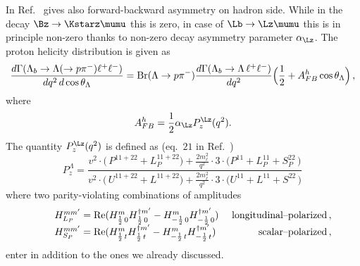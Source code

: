 In Ref.~\cite{Gutsche:2013pp} gives also forward-backward asymmetry on hadron side. While in the
decay $\Bz\to\Kstarz\mumu$ this is zero, in case of $\Lb\to\Lz\mumu$ this is in principle non-zero
thanks to non-zero \Lz decay asymmetry parameter $\alpha_{\Lz}$. The proton helicity distribution is
given as
\begin{equation}
\label{pz2}
\frac{d\Gamma(\Lambda_{b}\to \Lambda(\to p \pi^{-})\ell^{+}\ell^{-})}
     {dq^2\,d\cos\theta_\Lambda} 
={\rm Br}(\Lambda \to p\pi^{-})
 \frac{d\Gamma(\Lambda_b \to \Lambda\, \ell^{+}\ell^{-})}{d q^2}
\Big(\frac{1}{2}+A_{FB}^h\cos\theta_\Lambda\Big) \,, 
\end{equation}
where 
\begin{equation}
A_{FB}^h=\frac{1}{2}\alpha_{\Lz}P_z^\Lz(q^2).
\end{equation} 
The quantity $P_z^\Lz(q^2)$ is defined as (eq.~$21$ in Ref.~\cite{Gutsche:2013pp})
\begin{equation}
\label{pz1}
P_{z}^{\Lambda}=\frac{
v^{2}\cdot\big(\,P^{11+22}
+L_{P}^{11+22}\big)+\frac{2m_{\ell}^{2}}{q^{2}}\cdot 3 \cdot 
\big(P^{11}+L_{P}^{11}
+S_{P}^{22}\,\big)
}
{v^{2}\cdot\big(\,U^{11+22}
+L^{11+22}\big)+\frac{2m_{\ell}^{2}}{q^{2}}\cdot 3 \cdot
\big(U^{11}+L^{11}
+S^{22}\,\big) 
} \, 
\end{equation}
where two parity-violating combinations of amplitudes
\begin{equation}
\label{helcom3}
\qquad\begin{array}{lr}
\mbox{$H^{mm'}_{L_{P}}=
{\rm Re}
(H^{m}_{\frac{1}{2}\,0}H^{\dagger m'}_{\frac{1}{2}\,0}-H^{m}_{-\frac{1}{2}\,0}
H^{\dagger m'}_{-\frac{1}{2}\,0})$} & 
\hfill\mbox{ \rm longitudinal--polarized}\,, 
\\
\mbox{$H^{mm'}_{S_{P}}=
{\rm Re}
(H^{m}_{\frac{1}{2}\,t}H^{\dagger m'}_{\frac{1}{2}\,t}-H^{m}_{-\frac{1}{2}\,t}
H^{\dagger m'}_{-\frac{1}{2}\,t})$}
 & 
\hfill\mbox{ \rm scalar--polarized}\,, 
\end{array}\\
\end{equation}
enter in addition to the ones we already discussed.

